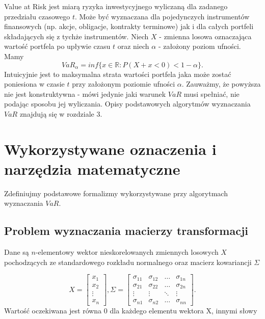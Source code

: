 \documentclass[11pt,titlepage]{article}
\numberwithin{equation}{section}
\begin{document}
Value at Risk jest miarą ryzyka inwestycyjnego wyliczaną dla zadanego przedziału czasowego $t$. Może być wyznaczana dla pojedynczych instrumentów finansowych (np. akcje, obligacje, kontrakty terminowe) jak i dla całych portfeli składających się z tychże instrumentów. Niech $X$ - zmienna losowa oznaczająca wartość portfela po upływie czasu $t$ oraz niech $\alpha$ - założony poziom ufności. Mamy
$$VaR_{\alpha}=inf\{ x\in \mathbb{R}:P(X+x<0) <  1-\alpha \}.$$
Intuicyjnie jest to maksymalna strata wartości portfela jaka może zostać poniesiona w czasie $t$ przy założonym poziomie ufności $\alpha$. Zauważmy, że powyższa nie jest konstruktywna - mówi jedynie jaki warunek $VaR$ musi spełniać, nie podając sposobu jej wyliczania. Opisy podstawowych algorytmów wyznaczania $VaR$ znajdują się w rozdziale 3.


\newpage
\section{Wykorzystywane oznaczenia i narzędzia matematyczne}
Zdefiniujmy podstawowe formalizmy wykorzystywane przy algorytmach wyznaczania $VaR$. 






\subsection{Problem wyznaczania macierzy transformacji} \label{mtransformacji}
Dane są $n$-elementowy wektor nieskorelowanych zmiennych losowych $X$ pochodzących ze standardowego rozkładu normalnego oraz macierz kowariancji $\Sigma$

\begin{equation} 
X=
\begin{bmatrix}
 x_1 \\ 
 x_2 \\
\vdots \\
x_n
\end{bmatrix}
,\Sigma=\begin{bmatrix}
\sigma_{11} & \sigma_{12} & \hdots & \sigma_{1n} \\ 
\sigma_{21} & \sigma_{22} & \hdots & \sigma_{2n} \\
\vdots & \vdots & \ddots & \vdots\\
\sigma_{n1} & \sigma_{n2} & \hdots & \sigma_{nn}
\end{bmatrix}.
\end{equation} 
Wartość oczekiwana jest  równa 0 dla każdego elementu wektora X, innymi słowy
\end{document}
